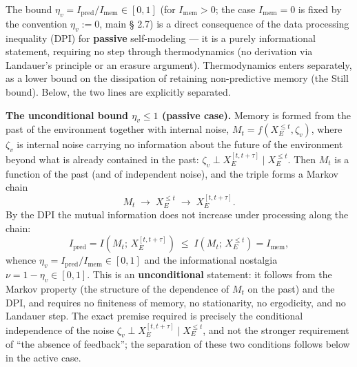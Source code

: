 \documentclass[pdflatex,sn-mathphys-ay]{sn-jnl}
\begin{document}
The bound \(\eta_v = I_{\text{pred}}/I_{\text{mem}} \in [0,1]\) (for \(I_{\text{mem}} > 0\); the case \(I_{\text{mem}} = 0\) is fixed by the convention \(\eta_v := 0\), main § 2.7) is a direct consequence of the data processing inequality (DPI) for \textbf{passive} self-modeling --- it is a purely informational statement, requiring no step through thermodynamics (no derivation via Landauer's principle or an erasure argument). Thermodynamics enters separately, as a lower bound on the dissipation of retaining non-predictive memory (the Still bound). Below, the two lines are explicitly separated.

\textbf{The unconditional bound \(\eta_v \le 1\) (passive case).} Memory is formed from the past of the environment together with internal noise, \(M_t = f(X_E^{\le t}, \zeta_v)\), where \(\zeta_v\) is internal noise carrying no information about the future of the environment beyond what is already contained in the past: \(\zeta_v \perp X_E^{[t, t+\tau]} \mid X_E^{\le t}\). Then \(M_t\) is a function of the past (and of independent noise), and the triple forms a Markov chain \[M_t \;\to\; X_E^{\le t} \;\to\; X_E^{[t, t+\tau]}.\] By the DPI the mutual information does not increase under processing along the chain: \[I_{\text{pred}} = I\!\left(M_t;\, X_E^{[t, t+\tau]}\right) \;\le\; I\!\left(M_t;\, X_E^{\le t}\right) = I_{\text{mem}},\] whence \(\eta_v = I_{\text{pred}}/I_{\text{mem}} \in [0, 1]\) and the informational nostalgia \(\nu = 1 - \eta_v \in [0, 1]\). This is an \textbf{unconditional} statement: it follows from the Markov property (the structure of the dependence of \(M_t\) on the past) and the DPI, and requires no finiteness of memory, no stationarity, no ergodicity, and no Landauer step. The exact premise required is precisely the conditional independence of the noise \(\zeta_v \perp X_E^{[t, t+\tau]} \mid X_E^{\le t}\), and not the stronger requirement of ``the absence of feedback''; the separation of these two conditions follows below in the active case.
\end{document}
